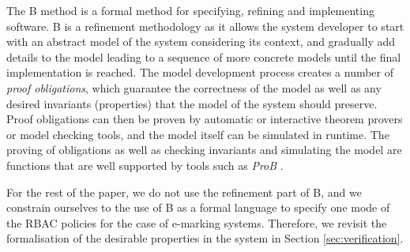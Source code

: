 The B method \cite{Abrial-BBook-1996} is a formal method for specifying, refining and implementing software.  B is a refinement methodology as it allows the system developer to start with an abstract model of the system considering its context, and gradually add details to the model leading to a sequence of more concrete models until the final implementation is reached.  The model development process creates a number of \textit{proof obligations}, which guarantee the correctness of the model as well as any desired invariants (properties) that the model of the system should preserve. Proof obligations can then be proven by automatic or interactive theorem provers or model checking tools, and the model itself can be simulated in runtime.  The proving of obligations as well as checking invariants and simulating the model are functions that are well supported by tools such as \textit{ProB} \cite{LeuschelB03}.

For the rest of the paper, we do not use the refinement part of B, and we constrain ourselves to the use of B as a formal language to specify one mode of the RBAC policies for the case of e-marking systems.   Therefore, we revisit the formalisation of the desirable properties in the system in Section \ref{sec:verification}.
